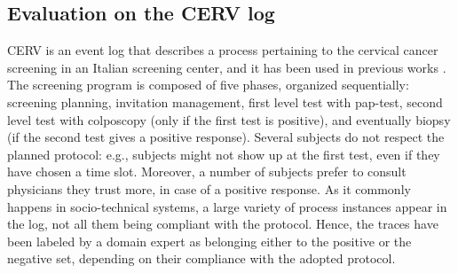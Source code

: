 


\subsection{Evaluation on the CERV log}
\label{subsec:cerv}

CERV is an event log that describes a process pertaining to the cervical cancer screening in an Italian screening center, and it has been used in previous works \cite{2007b-Lamma,deviant-tkde}. The screening program is composed of five phases, organized sequentially: screening planning, invitation management, first level test with pap-test, second level test with colposcopy (only if the first test is positive), and eventually biopsy (if the second test gives a positive response). Several subjects do not respect the planned protocol: e.g., subjects might not show up at the first test, even if they have chosen a time slot. Moreover, a number of subjects prefer to consult physicians they trust more, in case of a positive response. As it commonly happens in socio-technical systems, a large variety of process instances appear in the log, not all them being compliant with the protocol.
%
Hence, the traces have been labeled by a domain expert as belonging either to the positive or the negative set, depending on their compliance with the adopted protocol.

